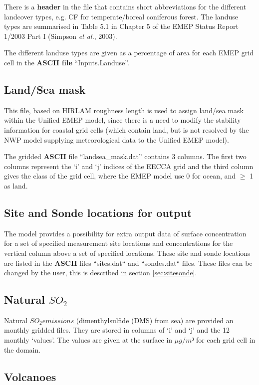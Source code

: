There is a {\bf header} in the file that contains short abbreviations 
for the different landcover
types, e.g. CF for temperate/boreal coniferous forest. The landuse
types are summarised in Table 5.1 in Chapter 5 of the EMEP Status
Report 1/2003 Part I (Simpson {\sl et al.}, 2003).

The different landuse types are given as a percentage of area for each 
EMEP grid cell in the {\bf ASCII file} ``Inputs.Landuse''. 



\subsection{Land/Sea mask}
This file, based on HIRLAM roughness length is used
to assign land/sea mask within the Unified EMEP model, since there is
a need to modify the stability information for coastal grid cells
(which contain land, but is not resolved by the NWP model supplying 
meteorological data to the Unified EMEP model). 

The gridded {\bf ASCII} file ``landsea\_mask.dat'' contains 3 columns. 
The first two columns represent the `i' and `j' indices of the EECCA
grid and the third column gives the class of the grid cell, where the 
EMEP model use 0 for ocean, and $\geq$ 1 as land.%

\subsection{Site and Sonde locations for output}\label{sec:sitessondes_input}
The model provides a possibility for extra output data of surface concentration 
for a set of specified measurement site locations and concentrations for the vertical 
column above a set of specified locations. These site and sonde locations are listed 
in the {\bf ASCII} files ``sites.dat`` and ``sondes.dat`` files. These files can be 
changed by the user, this is described in section \ref{sec:sitesonde}.


\subsection{Natural $SO_2$}
Natural $SO_2 emissions$ (dimenthylsulfide (DMS) from sea) are provided 
an monthly gridded files. They are stored in columns of `i' and `j' and the 12 monthly `values'. 
The values are given at the surface in $\mu g /m³ $ for each grid cell in the domain. 

\subsection{Volcanoes}


